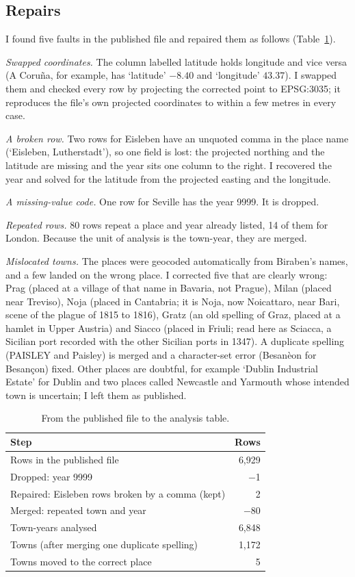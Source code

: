 \documentclass[11pt,a4paper]{article}
\begin{document}
\subsection{Repairs}
I found five faults in the published file and repaired them as follows (Table~\ref{tab:clean}).

\textit{Swapped coordinates.} The column labelled latitude holds longitude and vice versa (A Coru\~na, for example, has `latitude' $-8.40$ and `longitude' $43.37$). I swapped them and checked every row by projecting the corrected point to EPSG:3035; it reproduces the file's own projected coordinates to within a few metres in every case.

\textit{A broken row.} Two rows for Eisleben have an unquoted comma in the place name (`Eisleben, Lutherstadt'), so one field is lost: the projected northing and the latitude are missing and the year sits one column to the right. I recovered the year and solved for the latitude from the projected easting and the longitude.

\textit{A missing-value code.} One row for Seville has the year 9999. It is dropped.

\textit{Repeated rows.} 80 rows repeat a place and year already listed, 14 of them for London. Because the unit of analysis is the town-year, they are merged.

\textit{Mislocated towns.} The places were geocoded automatically from Biraben's names, and a few landed on the wrong place. I corrected five that are clearly wrong: Prag (placed at a village of that name in Bavaria, not Prague), Milan (placed near Treviso), Noja (placed in Cantabria; it is Noja, now Noicattaro, near Bari, scene of the plague of 1815 to 1816), Gratz (an old spelling of Graz, placed at a hamlet in Upper Austria) and Siacco (placed in Friuli; read here as Sciacca, a Sicilian port recorded with the other Sicilian ports in 1347). A duplicate spelling (PAISLEY and Paisley) is merged and a character-set error (Besan\`eon for Besan\c{c}on) fixed. Other places are doubtful, for example `Dublin Industrial Estate' for Dublin and two places called Newcastle and Yarmouth whose intended town is uncertain; I left them as published.

\begin{table}[tbp]\centering\small\caption{From the published file to the analysis table.}\label{tab:clean}\begin{tabular}{lr}\toprule Step & Rows\\\midrule
Rows in the published file & 6,929\\
Dropped: year 9999 & $-$1\\
Repaired: Eisleben rows broken by a comma (kept) & 2\\
Merged: repeated town and year & $-$80\\
Town-years analysed & 6,848\\
Towns (after merging one duplicate spelling) & 1,172\\
Towns moved to the correct place & 5\\
\bottomrule\end{tabular}\end{table}
\end{document}
